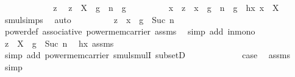 \begin{isabellebody}
\ \ \ \ \isamarkupfalse%
\isanewline
\ \ \ \ \ \ \isamarkupfalse%
\ z\ \isamarkupfalse%
\ {\isachardoublequoteopen}z\ {\isasymin}\ {\isacharparenleft}{\kern0pt}X\ {\isasymcdots}\ {\isacharbraceleft}{\kern0pt}g\ {\isacharcircum}{\kern0pt}\ n{\isacharbraceright}{\kern0pt}{\isacharparenright}{\kern0pt}\ {\isasymcdots}\ {\isacharbraceleft}{\kern0pt}g{\isacharbraceright}{\kern0pt}{\isachardoublequoteclose}\isanewline
\ \ \ \ \ \ \isamarkupfalse%
\ \isamarkupfalse%
\ x\ \ {\isachardoublequoteopen}z\ {\isacharequal}{\kern0pt}\ {\isacharparenleft}{\kern0pt}x\ {\isasymcdot}\ g\ {\isacharcircum}{\kern0pt}\ n{\isacharparenright}{\kern0pt}\ {\isasymcdot}\ g{\isachardoublequoteclose}\ \ hx{\isacharcolon}{\kern0pt}\ {\isachardoublequoteopen}x\ {\isasymin}\ X{\isachardoublequoteclose}\ \isamarkupfalse%
\ smul{\isachardot}{\kern0pt}simps\ \isamarkupfalse%
\ auto\isanewline
\ \ \ \ \ \ \isamarkupfalse%
\ \isamarkupfalse%
\ {\isachardoublequoteopen}z\ {\isacharequal}{\kern0pt}\ x\ {\isasymcdot}\ g\ {\isacharcircum}{\kern0pt}\ Suc\ n{\isachardoublequoteclose}\ \isanewline
\ \ \ \ \ \ \ \ \isamarkupfalse%
\ power{\isacharunderscore}{\kern0pt}def\ associative\ power{\isacharunderscore}{\kern0pt}mem{\isacharunderscore}{\kern0pt}carrier\ assms\ \isamarkupfalse%
\ {\isacharparenleft}{\kern0pt}simp\ add{\isacharcolon}{\kern0pt}\ in{\isacharunderscore}{\kern0pt}mono{\isacharparenright}{\kern0pt}\isanewline
\ \ \ \ \ \ \isamarkupfalse%
\ \isamarkupfalse%
\ {\isachardoublequoteopen}z\ {\isasymin}\ X\ {\isasymcdots}\ {\isacharbraceleft}{\kern0pt}g\ {\isacharcircum}{\kern0pt}\ Suc\ n{\isacharbraceright}{\kern0pt}{\isachardoublequoteclose}\ \isamarkupfalse%
\ hx\ assms\ \isanewline
\ \ \ \ \ \ \ \ \isamarkupfalse%
\ {\isacharparenleft}{\kern0pt}simp\ add{\isacharcolon}{\kern0pt}\ power{\isacharunderscore}{\kern0pt}mem{\isacharunderscore}{\kern0pt}carrier\ smul{\isachardot}{\kern0pt}smulI\ subsetD{\isacharparenright}{\kern0pt}\isanewline
\ \ \ \ \isamarkupfalse%
\isanewline
\ \ \isamarkupfalse%
\isanewline
\ \ \isamarkupfalse%
\ \isamarkupfalse%
\ {\isacharquery}{\kern0pt}case\ \isamarkupfalse%
\ assms\ \isamarkupfalse%
\ simp\isanewline
{}\isamarkupfalse%
%
\endisatagproof
{\isafoldproof}%

\end{isabellebody}
